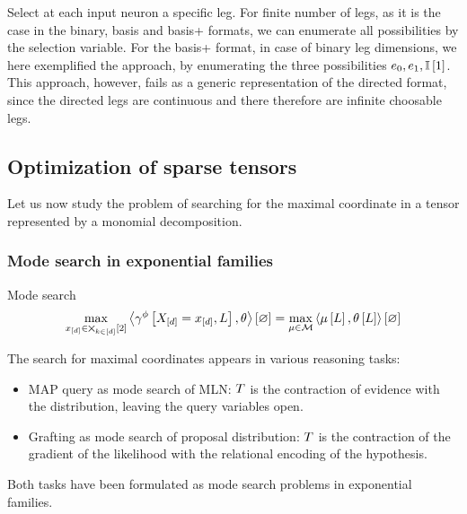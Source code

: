 \begin{remark}
	Select at each input neuron a specific leg.
	For finite number of legs, as it is the case in the binary, basis and basis+ formats, we can enumerate all possibilities by the selection variable.
	For the basis+ format, in case of binary leg dimensions, we here exemplified the approach, by enumerating the three possibilities $e_{0},e_{1},\mathbb{I}\left[1\right]$.
	This approach, however, fails as a generic representation of the directed format, since the directed legs are continuous and there therefore are infinite choosable legs.
\end{remark}





\subsection{Optimization of sparse tensors}

Let us now study the problem of searching for the maximal coordinate in a tensor represented by a monomial decomposition. 


\subsubsection{Mode search in exponential families}

Mode search 
\begin{align*}
	\max_{x_{[d]}\in\bigtimes_{k\in[d]}[2]} \left\langle \gamma^{\phi}\left[X_{[d]}=x_{[d]},L\right],\theta\right\rangle \left[ \varnothing \right] 
	= \max_{\mu\in\mathcal{M}} \left\langle \mu\left[L\right],\theta\left[L\right]\right\rangle \left[ \varnothing \right]
\end{align*}


The search for maximal coordinates appears in various reasoning tasks:
\begin{itemize}
	\item MAP query as mode search of MLN: $T$ is the contraction of evidence with the distribution, leaving the query variables open.
	\item Grafting as mode search of proposal distribution: $T$ is the contraction of the gradient of the likelihood with the relational encoding of the hypothesis.
\end{itemize}
Both tasks have been formulated as mode search problems in exponential families.



